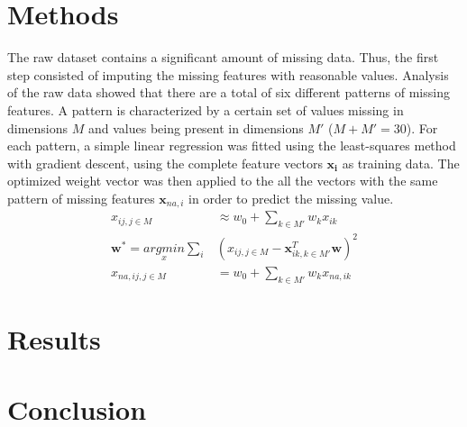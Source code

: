 \documentclass[10pt,conference,compsocconf]{IEEEtran}
\begin{document}
\section*{Methods}
The raw dataset contains a significant amount of missing data. Thus, the first step consisted of imputing the missing features with reasonable values. Analysis of the raw data showed that there are a total of six different patterns of missing features. A pattern is characterized by a certain set of values missing in dimensions $M$ and values being present in dimensions $M'$ ($M+M' = 30$). For each pattern, a simple linear regression was fitted using the least-squares method with gradient descent, using the complete feature vectors $\boldsymbol{x_i}$ as training data. The optimized weight vector was then applied to the all the vectors with the same pattern of missing features $\boldsymbol{x}_{na,i}$ in order to predict the missing value.
\begin{align*}
{x}_{ij, j \in M} &\approx w_0 + \sum_{k \in M'} w_k {x}_{ik}\\
\boldsymbol{w}^* = \underset{x}{argmin}\sum_i & ({x}_{ij, j \in M} - \boldsymbol{x}^T_{ik, k \in M'} \boldsymbol{w})^2\\
{x}_{na,ij, j \in M} &= w_0 + \sum_{k \in M'} w_k {x}_{na,ik}
\end{align*}   
  

\section*{Results}
\section*{Conclusion}



\end{document}
